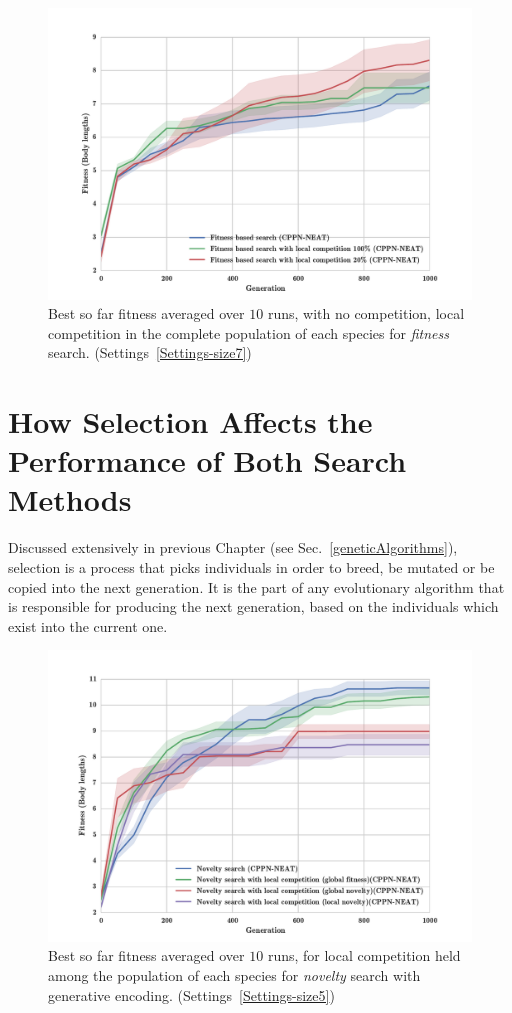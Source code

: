 \begin{figure}[t!]
\centering
\includegraphics[width=1.0\textwidth]{../Figures/Results/fitComp100_20percent.pdf}
\caption{Best so far fitness averaged over $10$ runs, with no competition, local competition in the complete population of each species for \emph{fitness} search. (Settings~\ref{Settings-size7})}
\label{fig:fitComp100_20percent}
\end{figure}

\section{How Selection Affects the Performance of Both Search Methods}

Discussed extensively in previous Chapter (see Sec.~\ref{geneticAlgorithms}), selection is a process that picks individuals in order to breed, be mutated or be copied into the next generation. It is the part of any evolutionary algorithm that is responsible for producing the next generation, based on the individuals which exist into the current one.


\begin{figure}[t!]
\centering
\includegraphics[width=1.0\textwidth]{../Figures/Results/NoveltyCompetitionsSize5.pdf}
\caption{Best so far fitness averaged over $10$ runs, for local competition held among the population of each species for \emph{novelty} search with generative encoding. (Settings~\ref{Settings-size5})}
\label{fig:NoveltyCompetitionsSize5}
\end{figure}


